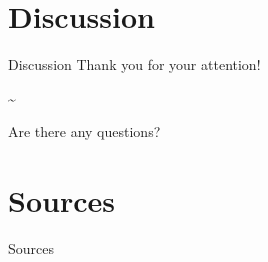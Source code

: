 \section*{Discussion}
\label{sec:discussion}

\begin{frame}{Discussion}
  \centering
  Thank you for your attention!

  \textasciitilde{}

  Are there any questions?
\end{frame}

\section*{Sources}
\label{sec:sources}

\begin{frame}[shrink]{Sources}
  \printbibliography
\end{frame}
